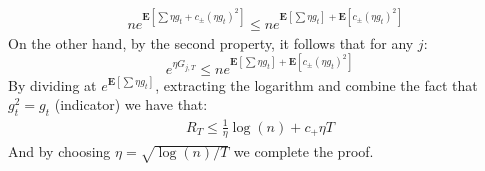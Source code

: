 \documentclass{article}
\newcommand{\expp}[1]{ \mathbf{E} \left[ {#1} \right]}
\begin{document}
\begin{multicols*}{2}
\begin{equation*}
\begin{split}
& n e^{\expp{ \sum {\eta g_{t} + c_{\pm}\left( \eta g_{t} \right)^{2} }}} \le n e^{\expp{ \sum {\eta g_{t}}} +\expp{{ c_{\pm}\left( \eta g_{t} \right)^{2} }}}
  \end{split}
\end{equation*}
On the other hand, by the second property, it follows that for any $j$: 
\begin{equation*}
  e^{\eta G_{j,T}} \le n e^{\expp{ \sum {\eta g_{t}}} +\expp{{ c_{\pm}\left( \eta g_{t} \right)^{2} }}}
\end{equation*} 
By dividing at $e^{\expp{ \sum {\eta g_{t}}}}$, extracting the logarithm and combine the fact that $g_{t}^2 = g_{t}$ (indicator) we have that: 
\begin{equation*}
  \begin{split}
    R_{T} \le \frac{1}{\eta}\log\left( n \right) + c_{+}\eta T
  \end{split}
\end{equation*}
And by choosing $\eta = \sqrt{\log\left( n \right)/T }$ we complete the proof. 

\end{multicols*}
\end{document}
